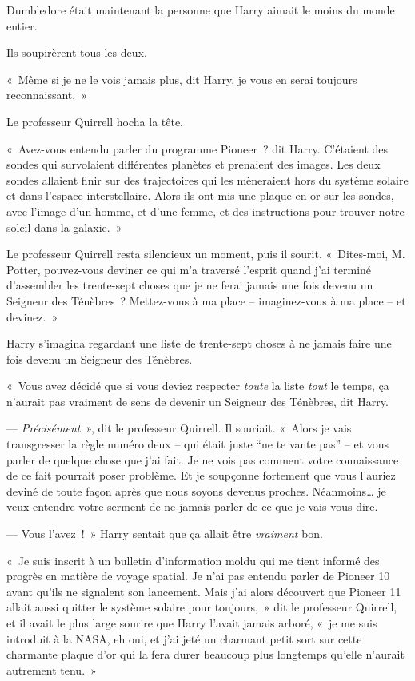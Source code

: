 Dumbledore était maintenant la personne que Harry aimait le moins du monde entier.

Ils soupirèrent tous les deux.

«~Même si je ne le vois jamais plus, dit Harry, je vous en serai toujours reconnaissant.~»

Le professeur Quirrell hocha la tête.

«~Avez-vous entendu parler du programme Pioneer~? dit Harry.
C'étaient des sondes qui survolaient différentes planètes et prenaient des images.
Les deux sondes allaient finir sur des trajectoires qui les mèneraient hors du système solaire et dans l'espace interstellaire.
Alors ils ont mis une plaque en or sur les sondes, avec l'image d'un homme, et d'une femme, et des instructions pour trouver notre soleil dans la galaxie.~»

Le professeur Quirrell resta silencieux un moment, puis il sourit.
«~Dites-moi, M. Potter, pouvez-vous deviner ce qui m'a traversé l'esprit quand j'ai terminé d'assembler les trente-sept choses que je ne ferai jamais une fois devenu un Seigneur des Ténèbres~?
Mettez-vous à ma place -- imaginez-vous à ma place -- et devinez.~»

Harry s'imagina regardant une liste de trente-sept choses à ne jamais faire une fois devenu un Seigneur des Ténèbres.

«~Vous avez décidé que si vous deviez respecter \emph{toute} la liste \emph{tout} le temps, ça n'aurait pas vraiment de sens de devenir un Seigneur des Ténèbres, dit Harry.

--- \emph{Précisément}~», dit le professeur Quirrell.
Il souriait.
«~Alors je vais transgresser la règle numéro deux -- qui était juste “ne te vante pas” -- et vous parler de quelque chose que j'ai fait.
Je ne vois pas comment votre connaissance de ce fait pourrait poser problème.
Et je soupçonne fortement que vous l'auriez deviné de toute façon après que nous soyons devenus proches.
Néanmoins… je veux entendre votre serment de ne jamais parler de ce que je vais vous dire.

--- Vous l'avez~!~»
Harry sentait que ça allait être \emph{vraiment} bon.

«~Je suis inscrit à un bulletin d'information moldu qui me tient informé des progrès en matière de voyage spatial.
Je n'ai pas entendu parler de Pioneer 10 avant qu'ils ne signalent son lancement.
Mais j'ai alors découvert que Pioneer 11 allait aussi quitter le système solaire pour toujours,~» dit le professeur Quirrell, et il avait le plus large sourire que Harry l'avait jamais arboré, «~je me suis introduit à la NASA, eh oui, et j'ai jeté un charmant petit sort sur cette charmante plaque d'or qui la fera durer beaucoup plus longtemps qu'elle n'aurait autrement tenu.~»

